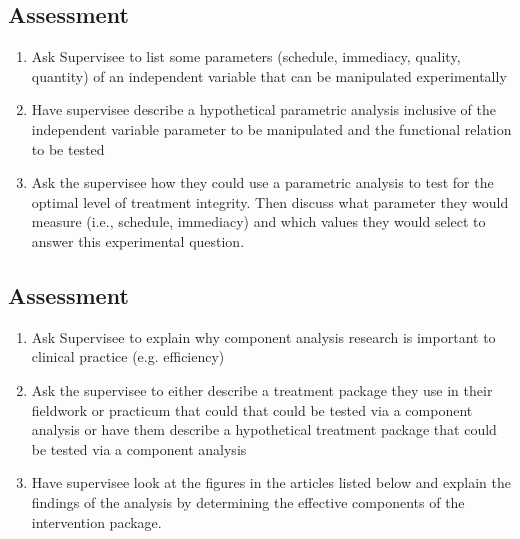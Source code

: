 \subsection{Assessment}
\begin{enumerate}
\item Ask Supervisee to list some parameters (schedule, immediacy, quality, quantity) of an independent variable that can be manipulated experimentally
\item Have supervisee describe a hypothetical parametric analysis inclusive of the independent variable parameter to be manipulated and the functional relation to be tested 
\item Ask the supervisee how they could use a parametric analysis to test for the optimal level of treatment integrity. Then discuss what parameter they would measure (i.e., schedule, immediacy) and which values they would select to answer this experimental question.  
\end{enumerate}
%
\subsection{Assessment}
\begin{enumerate}
\item Ask Supervisee to explain why component analysis research is important to clinical practice (e.g. efficiency)
\item Ask the supervisee to either describe a treatment package they use in their fieldwork or practicum that could that could be tested via a component analysis or have them describe a hypothetical treatment package that could be tested via a component analysis 
\item Have supervisee look at the figures in the articles listed below and explain the findings of the analysis by determining the effective components of the intervention package.
\end{enumerate}
%
